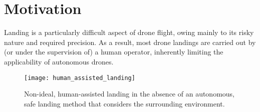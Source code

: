 \section{Motivation}

Landing is a particularly difficult aspect of drone flight,
owing mainly to its risky nature and required precision.
As a result, most drone landings are carried out by
(or under the supervision of)
a human operator,
inherently limiting the applicability of autonomous drones.

\begin{figure}[ht]
    \centering
    \texttt{[image: human\_assisted\_landing]}
    \caption{Non-ideal, human-assisted landing in the absence of an autonomous, safe landing method that considers the surrounding environment.}
\end{figure}